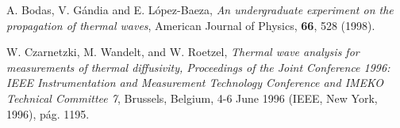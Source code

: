 \documentclass[twoside,twocolumn,a4paper]{article}
\begin{document}
\newpage
\begin{thebibliography}{99} %


 A. Bodas, V. G\'andia and E. L\'opez-Baeza, \textit{An undergraduate experiment on the propagation of thermal waves}, American Journal of Physics, \textbf{66}, 528 (1998).

 W. Czarnetzki, M. Wandelt, and W. Roetzel, \textit{Thermal wave analysis for measurements of thermal diffusivity, Proceedings of the Joint Conference 1996: IEEE Instrumentation and Measurement Technology Conference and IMEKO Technical Committee 7}, Brussels, Belgium, 4-6 June 1996 (IEEE, New York, 1996), p\'ag. 1195.
 
\end{thebibliography}


\end{document}
